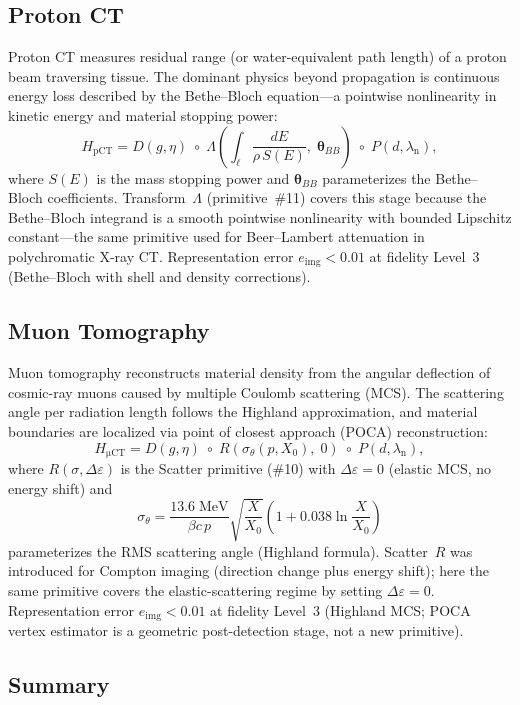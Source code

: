 \documentclass[11pt]{article}
\theoremstyle{definition}
\begin{document}
\subsection{Proton CT}

Proton CT measures residual range (or water-equivalent path length) of a
proton beam traversing tissue.  The dominant physics beyond propagation is
continuous energy loss described by the Bethe--Bloch equation---a pointwise
nonlinearity in kinetic energy and material stopping power:
\[
  H_{\mathrm{pCT}} = D(g,\eta) \;\circ\;
  \Lambda\!\left(\textstyle\int_\ell \frac{dE}{\rho\,S(E)},\;
  \boldsymbol{\theta}_{BB}\right)
  \;\circ\; P(d,\lambda_{\mathrm{n}}),
\]
where $S(E)$ is the mass stopping power and $\boldsymbol{\theta}_{BB}$
parameterizes the Bethe--Bloch coefficients.
Transform~$\Lambda$ (primitive~\#11) covers this stage because the
Bethe--Bloch integrand is a smooth pointwise nonlinearity with bounded
Lipschitz constant---the same primitive used for Beer--Lambert attenuation
in polychromatic X-ray CT.  Representation error $e_{\mathrm{img}} < 0.01$
at fidelity Level~3 (Bethe--Bloch with shell and density corrections).

\subsection{Muon Tomography}

Muon tomography reconstructs material density from the angular deflection of
cosmic-ray muons caused by multiple Coulomb scattering (MCS).  The scattering
angle per radiation length follows the Highland approximation, and material
boundaries are localized via point of closest approach (POCA) reconstruction:
\[
  H_{\mathrm{\mu CT}} = D(g,\eta) \;\circ\;
  R\!\left(\sigma_\theta(p,X_0),\;0\right)
  \;\circ\; P(d,\lambda_{\mathrm{n}}),
\]
where $R(\sigma,\Delta\varepsilon)$ is the Scatter primitive (\#10) with
$\Delta\varepsilon = 0$ (elastic MCS, no energy shift) and
\[
  \sigma_\theta = \frac{13.6\;\mathrm{MeV}}{\beta c\, p}
  \sqrt{\frac{X}{X_0}}
  \left(1 + 0.038\ln\frac{X}{X_0}\right)
\]
parameterizes the RMS scattering angle (Highland formula).
Scatter~$R$ was introduced for Compton imaging (direction change plus energy
shift); here the same primitive covers the elastic-scattering regime by
setting $\Delta\varepsilon = 0$.  Representation error $e_{\mathrm{img}} < 0.01$
at fidelity Level~3 (Highland MCS; POCA vertex estimator is a geometric
post-detection stage, not a new primitive).

\subsection{Summary}
\end{document}
